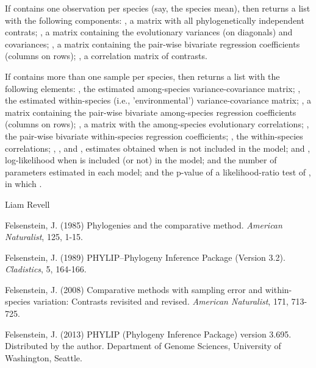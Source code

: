\documentclass[a4paper]{book}
\begin{document}
%
\begin{Value}
If  contains one observation per species (say, the species mean), then  returns a list with the following components: , a matrix with all phylogenetically independent contrats; , a matrix containing the evolutionary variances (on diagonals) and covariances; , a matrix containing the pair-wise bivariate regression coefficients (columns on rows); , a correlation matrix of contrasts.

If  contains more than one sample per species, then  returns a list with the following elements: , the estimated among-species variance-covariance matrix; , the estimated within-species (i.e., 'environmental') variance-covariance matrix; , a matrix containing the pair-wise bivariate among-species regression coefficients (columns on rows); , a matrix with the among-species evolutionary correlations; , the pair-wise bivariate within-species regression coefficients; , the within-species correlations; , , and , estimates obtained when  is not included in the model;  and , log-likelihood when  is included (or not) in the model;  and  the number of parameters estimated in each model; and  the p-value of a likelihood-ratio test of , in which . 
\end{Value}
%
\begin{Author}\relax
Liam Revell 
\end{Author}
%
\begin{References}\relax
Felsenstein, J. (1985) Phylogenies and the comparative method. \emph{American Naturalist}, 125, 1-15.

Felsenstein, J. (1989) PHYLIP--Phylogeny Inference Package (Version 3.2). \emph{Cladistics}, 5, 164-166.

Felsenstein, J. (2008) Comparative methods with sampling error and within-species variation: Contrasts revisited and revised. \emph{American Naturalist}, 171, 713-725.

Felsenstein, J. (2013) PHYLIP (Phylogeny Inference Package) version 3.695. Distributed by the author. Department of Genome Sciences, University of Washington, Seattle.
\end{References}
\end{document}
